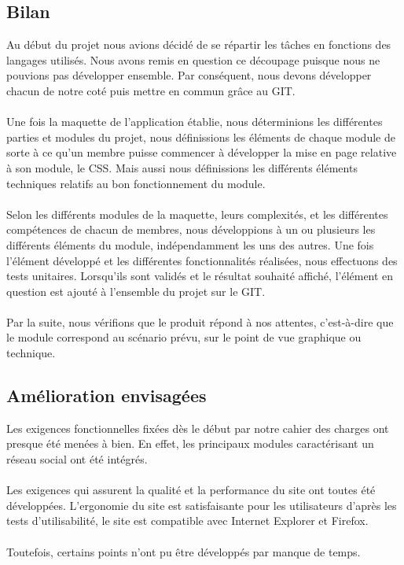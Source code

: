 \documentclass[11pt]{article} %
\begin{document}
\subsection{Bilan}
Au début du projet nous avions décidé de se répartir les tâches en fonctions des langages utilisés. Nous avons remis en question ce découpage puisque nous ne pouvions pas développer ensemble. Par conséquent, nous devons développer chacun de notre coté puis mettre en commun grâce au GIT.\\
\\
Une fois la maquette de l’application établie, nous déterminions les différentes parties et modules du projet, nous définissions les éléments de chaque module de sorte à ce qu’un membre puisse commencer à développer la mise en page relative à son module, le CSS. Mais aussi nous définissions les différents éléments techniques relatifs au bon fonctionnement du module. \\
\\
Selon les différents modules de la maquette, leurs complexités, et les différentes compétences de chacun de membres, nous développions à un ou plusieurs les différents éléments du module, indépendamment les uns des autres. Une fois l’élément développé et les différentes fonctionnalités réalisées, nous effectuons des tests unitaires. Lorsqu’ils sont validés et le résultat souhaité affiché, l’élément en question est ajouté à l’ensemble du projet sur le GIT.\\
\\
Par la suite, nous vérifions que le produit répond à nos attentes, c’est-à-dire que le module correspond au scénario prévu, sur le point de vue graphique ou technique.


\subsection{Amélioration envisagées}
Les exigences fonctionnelles fixées dès le début par notre cahier des charges ont presque été menées à bien. En effet, les principaux modules caractérisant un réseau social ont été intégrés.\\
\\
Les exigences qui assurent la qualité et la performance du site ont toutes été développées. L’ergonomie du site est satisfaisante pour les utilisateurs d’après les tests d’utilisabilité, le site est compatible avec Internet Explorer et Firefox. \\
\\
Toutefois, certains points n'ont pu être développés par manque de temps.
\end{document}
